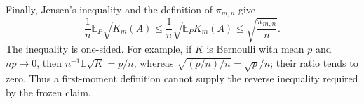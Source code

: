Finally, Jensen's inequality and the definition of \(\pi_{m,n}\) give
\[
 \frac1n\mathbb E_P\sqrt{K_m(A)}
 \leq\frac1n\sqrt{\mathbb E_PK_m(A)}
 \leq\sqrt{\frac{\pi_{m,n}}n}.
\]
The inequality is one-sided.  For example, if \(K\) is Bernoulli with mean \(p\) and \(np\to0\), then \(n^{-1}\mathbb E\sqrt K=p/n\), whereas \(\sqrt{(p/n)/n}=\sqrt p/n\); their ratio tends to zero.  Thus a first-moment definition cannot supply the reverse inequality required by the frozen claim.